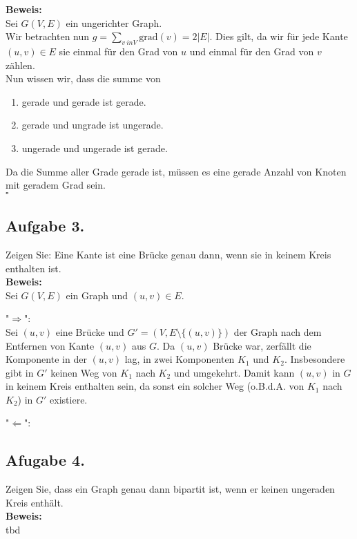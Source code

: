 \documentclass[11pt,a4paper,ngerman]{article}
\begin{document}
\textbf{Beweis:}\\

Sei $G(V,E)$ ein ungerichter Graph.\\

Wir betrachten nun $g = \underset{v\ in V}{\sum} \text{grad}(v) = 2 |E|$.
Dies gilt, da wir für jede Kante $(u,v) \in E$ sie einmal für den Grad von $u$ und einmal
für den Grad von $v$ zählen.\\

Nun wissen wir, dass die summe von
\begin{enumerate}
	\item gerade und gerade ist gerade.
	\item gerade und ungrade ist ungerade.
	\item ungerade und ungerade ist gerade.
\end{enumerate}
Da die Summe aller Grade gerade ist, müssen es eine gerade Anzahl von Knoten mit geradem Grad sein.\\

\mbox{}\hfill$\square$

\subsection*{Aufgabe 3.}

Zeigen Sie: Eine Kante ist eine Brücke genau dann, wenn sie in keinem Kreis enthalten ist.\\

\textbf{Beweis:}\\
Sei $G(V,E)$ ein Graph und $(u,v) \in E$.

"$\Rightarrow$":\\
Sei $(u,v)$ eine Brücke und $G' = (V,E \setminus \{ (u,v) \})$ der Graph nach dem Entfernen von Kante $(u,v)$ aus $G$.
Da $(u,v)$ Brücke war, zerfällt die Komponente in der $(u,v)$ lag, in zwei Komponenten $K_1$ und $K_2$.
Insbesondere gibt in $G'$ keinen Weg von $K_1$ nach $K_2$ und umgekehrt. Damit kann $(u,v)$ in $G$ in
keinem Kreis enthalten sein, da sonst ein solcher Weg (o.B.d.A. von $K_1$ nach $K_2$) in $G'$ existiere.

"$\Leftarrow$":\\


\subsection*{Afugabe 4.}

Zeigen Sie, dass ein Graph genau dann bipartit ist, wenn er keinen ungeraden Kreis enthält.\\

\textbf{Beweis:}\\

tbd

\label{LastPage}
\end{document}

